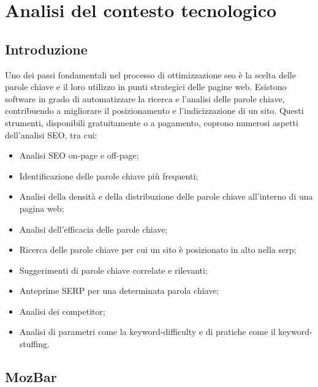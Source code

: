 \chapter{Analisi del contesto tecnologico}
\label{cap:analisi-soluzioni-esistenti}


\section{Introduzione}

\par Uno dei passi fondamentali nel processo di ottimizzazione \gls{seo} è la scelta delle parole chiave e il loro utilizzo in punti strategici delle pagine web. Esistono software in grado di automatizzare la ricerca e l'analisi delle parole chiave, contribuendo a migliorare il posizionamento e l'indicizzazione di un sito. Questi strumenti, disponibili gratuitamente o a pagamento, coprono numerosi aspetti dell'analisi SEO, tra cui:
\begin{itemize}
    \item Analisi SEO \gls{on-page} e \gls{off-page};
    \item Identificazione delle parole chiave più frequenti;
    \item Analisi della densità e della distribuzione delle parole chiave all'interno di una pagina web;
    \item Analisi dell'efficacia delle parole chiave;
    \item Ricerca delle parole chiave per cui un sito è posizionato in alto nella \gls{serp};
    \item Suggerimenti di parole chiave correlate e rilevanti;
    \item Anteprime SERP per una determinata parola chiave;
    \item Analisi dei competitor;
    \item Analisi di parametri come la \gls{keyword-difficulty} e di pratiche come il \gls{keyword-stuffing}.
\end{itemize}

\section{MozBar}

